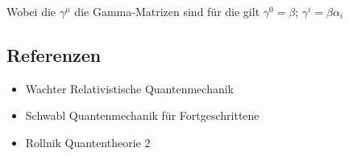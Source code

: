 Wobei die \(\gamma^\mu\) die Gamma-Matrizen sind für die gilt \(\gamma^0 = \beta\); \(\gamma^i = \beta\alpha_i\)




\subsection*{Referenzen}
\begin{itemize}
\item Wachter Relativistische Quantenmechanik
\item Schwabl Quantenmechanik für Fortgeschrittene
\item Rollnik Quantentheorie 2
\end{itemize}


